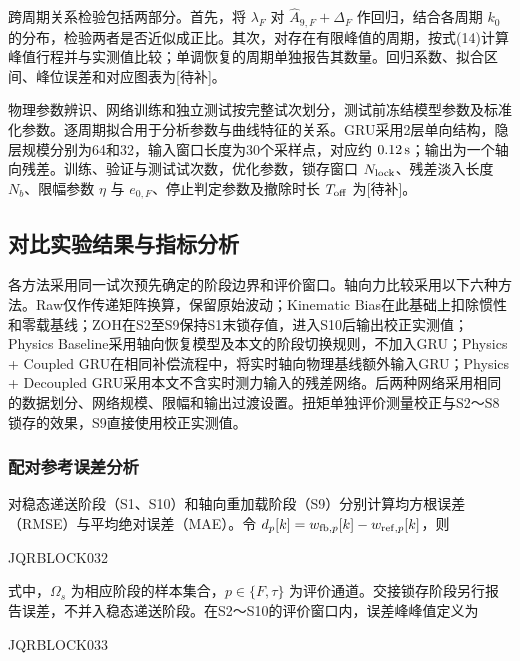 跨周期关系检验包括两部分。首先，将 $\lambda_F$ 对 $\widehat A_{9,F}+\Delta_F$ 作回归，结合各周期 $k_0$ 的分布，检验两者是否近似成正比。其次，对存在有限峰值的周期，按式(14)计算峰值行程并与实测值比较；单调恢复的周期单独报告其数量。回归系数、拟合区间、峰位误差和对应图表为[待补]。





物理参数辨识、网络训练和独立测试按完整试次划分，测试前冻结模型参数及标准化参数。逐周期拟合用于分析参数与曲线特征的关系。GRU采用2层单向结构，隐层规模分别为64和32，输入窗口长度为30个采样点，对应约 $0.12\,{\rm s}$；输出为一个轴向残差。训练、验证与测试试次数，优化参数，锁存窗口 $N_{\rm lock}$、残差淡入长度 $N_b$、限幅参数 $\eta$ 与 $e_{0,F}$、停止判定参数及撤除时长 $T_{\rm off}$ 为[待补]。




\subsection{对比实验结果与指标分析}


各方法采用同一试次预先确定的阶段边界和评价窗口。轴向力比较采用以下六种方法。Raw仅作传递矩阵换算，保留原始波动；Kinematic Bias在此基础上扣除惯性和零载基线；ZOH在S2至S9保持S1末锁存值，进入S10后输出校正实测值；Physics Baseline采用轴向恢复模型及本文的阶段切换规则，不加入GRU；Physics + Coupled GRU在相同补偿流程中，将实时轴向物理基线额外输入GRU；Physics + Decoupled GRU采用本文不含实时测力输入的残差网络。后两种网络采用相同的数据划分、网络规模、限幅和输出过渡设置。扭矩单独评价测量校正与S2～S8锁存的效果，S9直接使用校正实测值。





\subsubsection{配对参考误差分析}





对稳态递送阶段（S1、S10）和轴向重加载阶段（S9）分别计算均方根误差（RMSE）与平均绝对误差（MAE）。令 $d_p[k]=w_{{\rm fb},p}[k]-w_{{\rm ref},p}[k]$，则


JQRBLOCK032


式中，$\Omega_s$ 为相应阶段的样本集合，$p\in\{F,\tau\}$ 为评价通道。交接锁存阶段另行报告误差，不并入稳态递送阶段。在S2～S10的评价窗口内，误差峰峰值定义为


JQRBLOCK033







